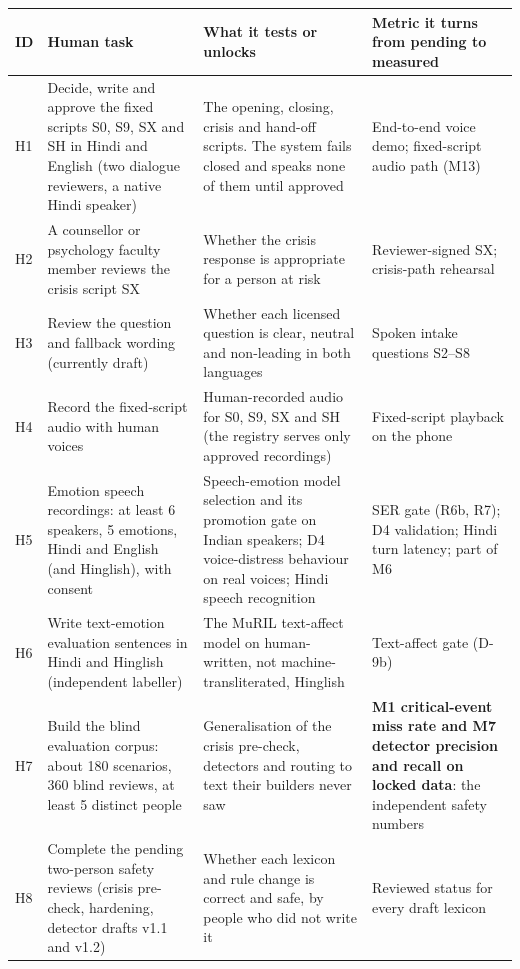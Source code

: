 \begin{longtable}{@{}>{\raggedright\arraybackslash}p{0.8cm}>{\raggedright\arraybackslash}p{4.2cm}>{\raggedright\arraybackslash}p{4.6cm}>{\raggedright\arraybackslash}p{4.4cm}@{}}
\toprule
\textbf{ID} & \textbf{Human task} & \textbf{What it tests or unlocks} & \textbf{Metric it turns from pending to measured} \\
\midrule
\endhead
H1 & Decide, write and approve the fixed scripts S0, S9, SX and SH in Hindi and English (two dialogue reviewers, a native Hindi speaker) & The opening, closing, crisis and hand-off scripts. The system fails closed and speaks none of them until approved & End-to-end voice demo; fixed-script audio path (M13) \\
H2 & A counsellor or psychology faculty member reviews the crisis script SX & Whether the crisis response is appropriate for a person at risk & Reviewer-signed SX; crisis-path rehearsal \\
H3 & Review the question and fallback wording (currently draft) & Whether each licensed question is clear, neutral and non-leading in both languages & Spoken intake questions S2--S8 \\
H4 & Record the fixed-script audio with human voices & Human-recorded audio for S0, S9, SX and SH (the registry serves only approved recordings) & Fixed-script playback on the phone \\
H5 & Emotion speech recordings: at least 6 speakers, 5 emotions, Hindi and English (and Hinglish), with consent & Speech-emotion model selection and its promotion gate on Indian speakers; D4 voice-distress behaviour on real voices; Hindi speech recognition & SER gate (R6b, R7); D4 validation; Hindi turn latency; part of M6 \\
H6 & Write text-emotion evaluation sentences in Hindi and Hinglish (independent labeller) & The MuRIL text-affect model on human-written, not machine-transliterated, Hinglish & Text-affect gate (D-9b) \\
H7 & Build the blind evaluation corpus: about 180 scenarios, 360 blind reviews, at least 5 distinct people & Generalisation of the crisis pre-check, detectors and routing to text their builders never saw & \textbf{M1 critical-event miss rate and M7 detector precision and recall on locked data}: the independent safety numbers \\
H8 & Complete the pending two-person safety reviews (crisis pre-check, hardening, detector drafts v1.1 and v1.2) & Whether each lexicon and rule change is correct and safe, by people who did not write it & Reviewed status for every draft lexicon \\

\end{longtable}
